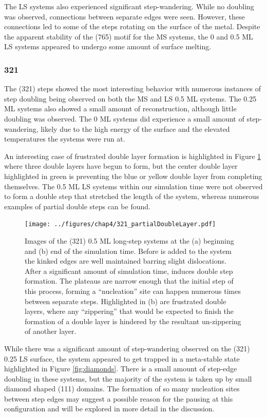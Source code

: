 The LS systems also experienced significant step-wandering. While no doubling
was observed, connections between separate edges were seen. However, these
connections led to some of the steps rotating on the surface of the metal.
Despite the apparent stability of the (765) motif for the MS systems, the 0 and
0.5 ML LS systems appeared to undergo some amount of surface melting.

\subsubsection{321}
The (321) steps showed the most interesting behavior with numerous instances of
step doubling being observed on both the MS and LS 0.5 ML systems. The 0.25 ML
systems also showed a small amount of reconstruction, although little doubling
was observed. The 0 ML systems did experience a small amount of step-wandering,
likely due to the high energy of the surface and the elevated temperatures the
systems were run at.

An interesting case of frustrated double layer formation is highlighted in
Figure \ref{fig:partialDoubleLayer} where three double layers have begun to form,
but the center double layer highlighted in green is preventing the blue or
yellow double layer from completing themselves. The 0.5 ML LS systems within
our simulation time were not observed to form a double step that stretched the
length of the system, whereas numerous examples of partial double steps can be
found.

\begin{figure}
\texttt{[image: ../figures/chap4/321\_partialDoubleLayer.pdf]}
\caption{Images of the (321) 0.5 ML long-step systems at the (a) beginning and
(b) end of the simulation time. Before  is added to the system the
kinked edges are well maintained barring slight dislocations. After a
significant amount of simulation time,  induces double step formation.
The plateaus are narrow enough that the initial step of this process, forming a
``nucleation'' site can happen numerous times between separate steps.
Highlighted in (b) are frustrated double layers, where any ``zippering'' that
would be expected to finish the formation of a double layer is hindered by the
resultant un-zippering of another layer.}
\label{fig:partialDoubleLayer}
\end{figure}

While there was a significant amount of step-wandering observed on the (321)
0.25 LS surface, the system appeared to get trapped in a meta-stable state
highlighted in Figure \ref{fig:diamonds}. There is a small amount of step-edge
doubling in these systems, but the majority of the system is taken up by small
diamond shaped (111) domains. The formation of so many nucleation sites between
step edges may suggest a possible reason for the pausing at this configuration
and will be explored in more detail in the discussion.

